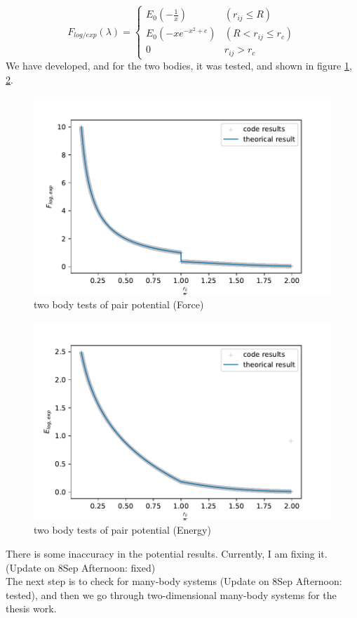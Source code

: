 \documentclass{article}
\begin{document}
\begin{equation}
    	F_{log/exp}(\lambda) =      
	\begin{cases}
		E_0 (-\frac{1}{x})
  & (r_{ij}\leq R)
  \\
		E_0 (-x e^{-x^2 + e})
  & (R<r_{ij}\leq r_c)
  \\ 0 
  &
  r_{ij} > r_c
	\end{cases}
\end{equation}
We have developed, and for the two bodies, it was tested, and shown in figure \ref{fig:test:1}, \ref{fig:test:2}.
\begin{figure}
    \centering
    \includegraphics{test_2_body.pdf}
    \caption{two body tests of pair potential (Force)}
    \label{fig:test:1}
\end{figure}
\begin{figure}
    \centering
    \includegraphics{test_2_body_energy.pdf}
    \caption{two body tests of pair potential (Energy)}
    \label{fig:test:2}
\end{figure}
There is some inaccuracy in the potential results. Currently, I am fixing it. (Update on 8Sep Afternoon: fixed)
\\
The next step is to check for many-body systems (Update on 8Sep Afternoon: tested), and then we go through two-dimensional many-body systems for the thesis work.
\end{document}
